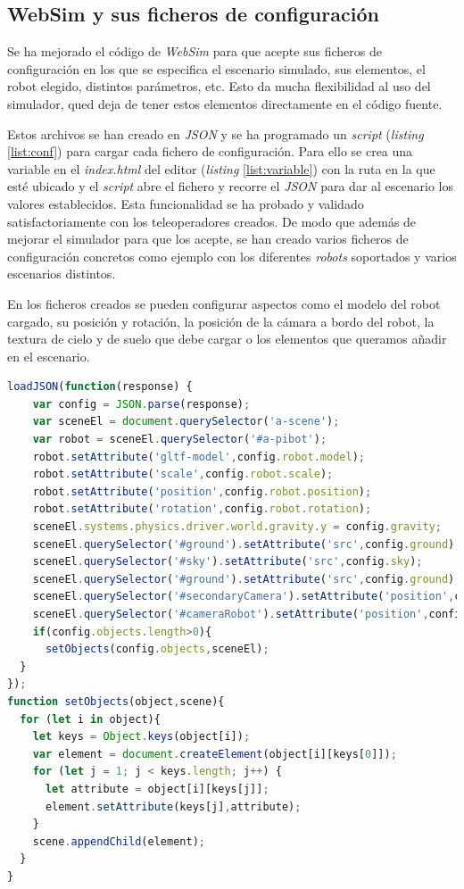 \subsection{WebSim y sus ficheros de configuración}

Se ha mejorado el código de \textit{WebSim} para que acepte sus ficheros de configuración en los que se especifica el escenario simulado, sus elementos, el robot elegido, distintos parámetros, etc. Esto da mucha flexibilidad al uso del simulador, qued deja de tener estos elementos directamente en el código fuente. 

Estos archivos se han creado en \textit{JSON} y se ha programado un \textit{script} (\textit{listing} \ref{list:conf}) para cargar cada fichero de configuración. Para ello se crea una variable en el \textit{index.html} del editor (\textit{listing} \ref{list:variable}) con la ruta en la que esté ubicado y el \textit{script} abre el fichero y recorre el \textit{JSON} para dar al escenario los valores establecidos.
Esta funcionalidad se ha probado y validado satisfactoriamente con los teleoperadores creados. De modo que además de mejorar el simulador para que los acepte, se han creado varios ficheros de configuración concretos como ejemplo con los diferentes \textit{robots} soportados y varios escenarios distintos. 

En los ficheros creados se pueden configurar aspectos como el modelo del robot cargado, su posición y rotación, la posición de la cámara a bordo del robot, la textura de cielo y de suelo que debe cargar o los elementos que queramos añadir en el escenario. 
\begin{lstlisting}[language=JavaScript,caption=\textit{script} que carga los ficheros de configuración,label={list:conf}]
  loadJSON(function(response) {
    var config = JSON.parse(response);
    var sceneEl = document.querySelector('a-scene');
    var robot = sceneEl.querySelector('#a-pibot');
    robot.setAttribute('gltf-model',config.robot.model);
    robot.setAttribute('scale',config.robot.scale);
    robot.setAttribute('position',config.robot.position);
    robot.setAttribute('rotation',config.robot.rotation);
    sceneEl.systems.physics.driver.world.gravity.y = config.gravity;
    sceneEl.querySelector('#ground').setAttribute('src',config.ground);
    sceneEl.querySelector('#sky').setAttribute('src',config.sky);
    sceneEl.querySelector('#ground').setAttribute('src',config.ground);
    sceneEl.querySelector('#secondaryCamera').setAttribute('position',config.secondaryCamera);
    sceneEl.querySelector('#cameraRobot').setAttribute('position',config.cameraRobot);
    if(config.objects.length>0){
      setObjects(config.objects,sceneEl);
  }
});
function setObjects(object,scene){
  for (let i in object){
    let keys = Object.keys(object[i]);
    var element = document.createElement(object[i][keys[0]]);
    for (let j = 1; j < keys.length; j++) {
      let attribute = object[i][keys[j]];
      element.setAttribute(keys[j],attribute);
    }
    scene.appendChild(element);
  }
}
\end{lstlisting}


